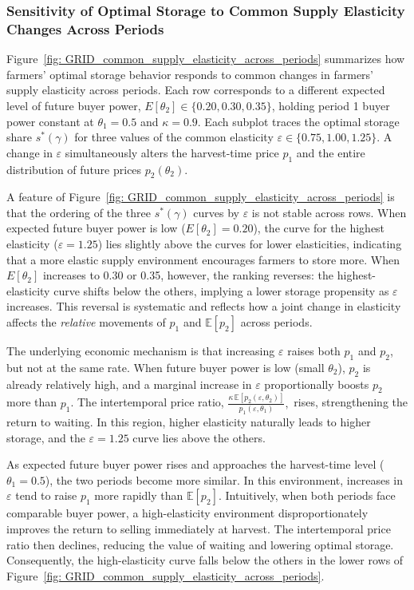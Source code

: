 \subsubsection{Sensitivity of Optimal Storage to Common Supply Elasticity Changes Across Periods}
\label{Appendix: Sensitivity to common Supply Elasticity change}
\noindent
Figure~\ref{fig: GRID_common_supply_elasticity_across_periods} summarizes how farmers' optimal storage behavior responds to common changes in farmers' supply elasticity across periods. Each row corresponds to a different expected level of future buyer power, $E[\theta_2]\in\{0.20,0.30,0.35\}$, holding period 1 buyer power constant at $\theta_1 = 0.5$ and $\kappa = 0.9$. Each subplot traces the optimal storage share $s^*(\gamma)$ for three values of the common elasticity $\varepsilon\in\{0.75,1.00,1.25\}$. A change in $\varepsilon$ simultaneously alters the harvest-time price $p_1$ and the entire distribution of future prices $p_2(\theta_2)$.


A feature of Figure~\ref{fig: GRID_common_supply_elasticity_across_periods} is that the ordering of the three $s^*(\gamma)$ curves by $\varepsilon$ is not stable across rows. When expected future buyer power is low ($E[\theta_2]=0.20$), the curve for the highest elasticity ($\varepsilon=1.25$) lies slightly above the curves for lower elasticities, indicating that a more elastic supply environment encourages farmers to store more. When $E[\theta_2]$ increases to 0.30 or 0.35, however, the ranking reverses: the highest-elasticity curve shifts below the others, implying a lower storage propensity as $\varepsilon$ increases. This reversal is systematic and reflects how a joint change in elasticity affects the \emph{relative} movements of $p_1$ and $\mathbb{E}[p_2]$ across periods.


The underlying economic mechanism is that increasing $\varepsilon$ raises both $p_1$ and $p_2$, but not at the same rate. When future buyer power is low (small $\theta_2$), $p_2$ is already relatively high, and a marginal increase in $\varepsilon$ proportionally boosts $p_2$ more than $p_1$. The intertemporal price ratio,
$\frac{\kappa\,\mathbb{E}[p_2(\varepsilon,\theta_2)]}{p_1(\varepsilon,\theta_1)},$
rises, strengthening the return to waiting. In this region, higher elasticity naturally leads to higher storage, and the $\varepsilon=1.25$ curve lies above the others.


As expected future buyer power rises and approaches the harvest-time level ($\theta_1=0.5$), the two periods become more similar. In this environment, increases in $\varepsilon$ tend to raise $p_1$ more rapidly than $\mathbb{E}[p_2]$. Intuitively, when both periods face comparable buyer power, a high-elasticity environment disproportionately improves the return to selling immediately at harvest. The intertemporal price ratio then declines, reducing the value of waiting and lowering optimal storage. Consequently, the high-elasticity curve falls below the others in the lower rows of Figure~\ref{fig: GRID_common_supply_elasticity_across_periods}.


